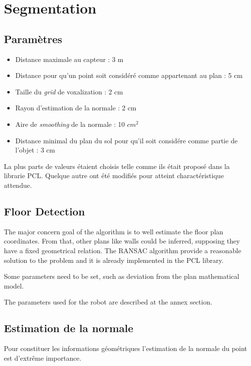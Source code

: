 \section{ Segmentation }

\subsection{ Paramètres }

\begin{itemize}
\item Distance maximale au capteur : 3 m
\item Distance pour qu'un point soit considéré comme appartenant au plan : 5 cm
\item Taille du \textit{grid} de voxalization : 2 cm
\item Rayon d'estimation de la normale : 2 cm
\item Aire de \textit{smoothing} de la normale : 10 $cm^2$
\item Distance minimal du plan du sol pour qu'il soit considére comme partie de l'objet : 3 cm
\end{itemize}

La plus parts de valeurs étaient choisis telle comme ils était proposé dans la librarie PCL. Quelque autre ont été modifiés pour atteint charactéristique attendue.



\subsection { Floor Detection } 

The major concern goal of the algorithm is to well estimate the floor plan coordinates. From that, other plans like walls could be inferred, supposing they have a fixed geometrical relation. The RANSAC algorithm provide a reasonable solution to the problem and it is already implemented in the PCL library.

Some parameters need to be set, such as deviation from the plan mathematical model.

The parameters used for the robot are described at the annex section.


\subsection{Estimation de la normale}

Pour constituer les informations géométriques l'estimation de la normale du point est d'extrême importance. 

